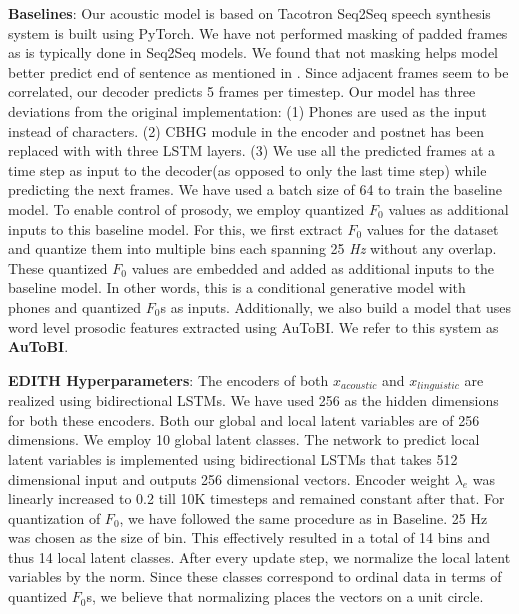 \textbf{Baselines}: Our acoustic model is based on Tacotron\cite{tacotron_original} Seq2Seq speech synthesis system is built using PyTorch\citep{pytorch}. We have not performed masking of padded frames as is typically done in Seq2Seq models. We found that not masking helps model better predict end of sentence as mentioned in \cite{tacotron_original}. Since adjacent frames seem to be correlated, our decoder predicts 5 frames per timestep. Our model has three deviations from the original implementation: (1) Phones are used as the input instead of characters. (2) CBHG module in the encoder and postnet has been replaced with with three LSTM layers. (3) We use all the predicted frames at a time step as input to the decoder(as opposed to only the last time step) while predicting the next frames.  We have used a batch size of 64 to train the baseline model. To enable control of prosody, we employ quantized $F_0$ values as additional inputs to this baseline model. For this, we first extract $F_0$ values for the dataset and quantize them into multiple bins each spanning 25 \textit{Hz} without any overlap. These quantized $F_0$ values are embedded and added as additional inputs to the baseline model. In other words, this is a conditional generative model with phones and quantized $F_0$s as inputs. Additionally, we also build a model that uses word level prosodic features extracted using AuToBI\citep{rosenberg2010autobi}. We refer to this system as \textbf{AuToBI}.

\textbf{EDITH Hyperparameters}: The encoders of both $x_{acoustic}$ and $x_{linguistic}$ are realized using bidirectional LSTMs. We have used 256 as the hidden dimensions for both these encoders. Both our global and local latent variables are of 256 dimensions. We employ 10 global latent classes. The network to predict local latent variables is implemented using bidirectional LSTMs that takes 512 dimensional input and outputs 256 dimensional vectors. Encoder weight $\lambda_e$ was linearly increased to 0.2 till 10K timesteps and remained constant after that. For quantization of $F_0$, we have followed the same procedure as in Baseline. 25 Hz was chosen as the size of bin. This effectively resulted in a total of 14 bins and thus 14 local latent classes. After every update step, we normalize the local latent variables by the norm. Since these classes correspond to ordinal data in terms of quantized $F_0$s, we believe that normalizing places the vectors on a unit circle.

